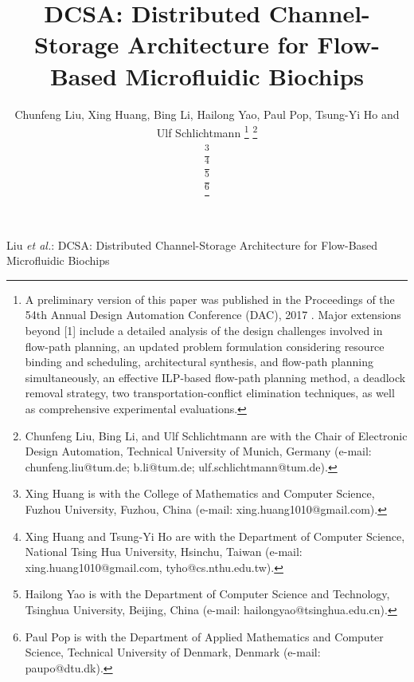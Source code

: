 \documentclass[journal]{IEEEtran}
\begin{document}
\allowdisplaybreaks[1]

\graphicspath{{Fig/}}
\def\figname{Fig.}
\def\algname{Algorithm}
\newcommand{\figurefontsize}{\small}
\newcommand{\papertitle}{DCSA: Distributed Channel-Storage Architecture for Flow-Based Microfluidic Biochips}
\newcommand{\tum}{Technical University of Munich (TUM)}

%

\title{\papertitle}

\author{	

Chunfeng Liu, Xing Huang, Bing Li, Hailong Yao, Paul Pop, Tsung-Yi Ho and Ulf Schlichtmann
 \thanks{A preliminary version of this paper was published in
the Proceedings of the 54th Annual Design Automation Conference (DAC), 2017 \cite{liu2017transport}. Major extensions beyond [1] include a detailed analysis of the design challenges involved in flow-path planning, an updated problem formulation considering resource binding and scheduling, architectural synthesis, and flow-path planning simultaneously, an effective ILP-based flow-path planning method, a deadlock removal strategy, two transportation-conflict elimination techniques, as well as comprehensive experimental evaluations.
}
\thanks{Chunfeng Liu, Bing Li, and Ulf Schlichtmann are with the Chair of
  Electronic Design Automation, Technical University of Munich, Germany (e-mail: chunfeng.liu@tum.de; b.li@tum.de; ulf.schlichtmann@tum.de).}

\thanks{Xing Huang is with the College of Mathematics and Computer Science, Fuzhou University, Fuzhou, China (e-mail: xing.huang1010@gmail.com).}

\thanks{Xing Huang and Tsung-Yi Ho are with the Department of Computer Science, National Tsing Hua University, Hsinchu, Taiwan (e-mail: xing.huang1010@gmail.com, tyho@cs.nthu.edu.tw).}

\thanks{Hailong Yao is with the Department of Computer Science and Technology, Tsinghua University, Beijing, China (e-mail: hailongyao@tsinghua.edu.cn).}

\thanks{Paul Pop is with the Department of Applied Mathematics and Computer Science, Technical University of Denmark, Denmark (e-mail: paupo@dtu.dk).}
}



\maketitle
 {Liu \MakeLowercase{\textit{et al.}}: \papertitle}
\end{document}
